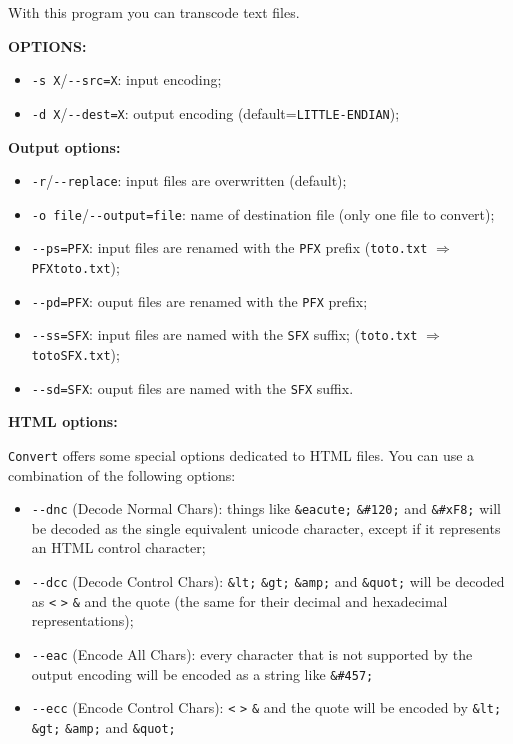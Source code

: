 \bigskip
\noindent With this program you can transcode text files.

\bigskip
\noindent \textbf{OPTIONS:}
\begin{itemize}
  \item \verb+-s X+/\verb+--src=X+: input encoding;
  \item \verb+-d X+/\verb+--dest=X+: output encoding
  (default=\verb$LITTLE-ENDIAN$);
\end{itemize}

\bigskip
\noindent \textbf{Output options:}
\begin{itemize}
  \item \verb+-r+/\verb+--replace+: input files are overwritten (default);
  \item \verb+-o file+/\verb+--output=file+: name of destination file (only one file to convert);
  \item \verb+--ps=PFX+: input files are renamed with the \verb+PFX+ prefix
        (\verb+toto.txt+ $\Rightarrow$ \verb+PFXtoto.txt+);
  \item \verb+--pd=PFX+: ouput files are renamed with the \verb+PFX+ prefix;
  \item \verb+--ss=SFX+: input files are named with the \verb+SFX+ suffix;
        (\verb+toto.txt+ $\Rightarrow$ \verb+totoSFX.txt+);
  \item \verb+--sd=SFX+: ouput files are named with the \verb+SFX+ suffix.
\end{itemize}

\bigskip
\noindent \textbf{HTML options:}

\noindent \verb+Convert+ offers some special options dedicated to HTML files. You can 
use a combination of the following options:

\begin{itemize}
  \item \verb+--dnc+ (Decode Normal Chars): things like \verb+&eacute;+
  \verb+&#120;+ and \verb+&#xF8;+ will be decoded as the single equivalent 
  unicode character, except if it represents an HTML control character;
  
  \item \verb+--dcc+ (Decode Control Chars): \verb+&lt;+ \verb+&gt;+
  \verb+&amp;+ and \verb+&quot;+ will be decoded as \verb+<+ \verb+>+
  \verb+&+ and the quote (the same for their decimal and hexadecimal
  representations);
  
  \item \verb+--eac+ (Encode All Chars): every character that is not supported by
  the output encoding will be encoded as a string like \verb+&#457;+
  
  \item \verb+--ecc+ (Encode Control Chars): \verb+<+ \verb+>+
  \verb+&+ and the quote will be encoded by \verb+&lt;+ \verb+&gt;+
  \verb+&amp;+ and \verb+&quot;+
\end{itemize} 


